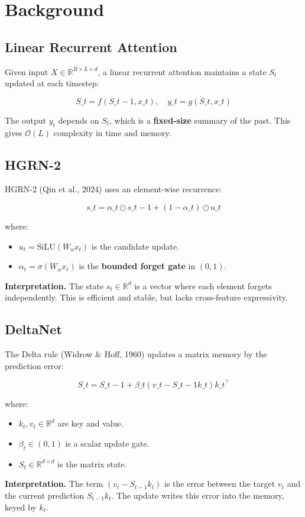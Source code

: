 \section{Background}

\subsection{Linear Recurrent Attention}

Given input $X \in \mathbb{R}^{B \times L \times d}$, a linear recurrent 
attention maintains a state $S_t$ updated at each timestep:

\[
S\_t = f(S\_{t-1}, x\_t), \quad
y\_t = g(S\_t, x\_t)
\tag{3.1}
\]

The output $y_t$ depends on $S_t$, which is a \textbf{fixed-size} summary of the 
past. This gives $\mathcal{O}(L)$ complexity in time and memory.

\subsection{HGRN-2}

HGRN-2 (Qin et al., 2024) uses an element-wise recurrence:

\[
s\_t = \alpha\_t \odot s\_{t-1} + (1 - \alpha\_t) \odot u\_t
\tag{3.2}
\]

where:

\begin{itemize}
\item $u_t = \text{SiLU}(W_u x_t)$ is the candidate update.
\item $\alpha_t = \sigma(W_\alpha x_t)$ is the \textbf{bounded forget gate} in $(0, 1)$.

\end{itemize}
\textbf{Interpretation.} The state $s_t \in \mathbb{R}^d$ is a vector where each 
element forgets independently. This is efficient and stable, but lacks 
cross-feature expressivity.

\subsection{DeltaNet}

The Delta rule (Widrow \& Hoff, 1960) updates a matrix memory by the 
prediction error:

\[
S\_t = S\_{t-1} + \beta\_t (v\_t - S\_{t-1} k\_t) k\_t^\top
\tag{3.3}
\]

where:

\begin{itemize}
\item $k_t, v_t \in \mathbb{R}^d$ are key and value.
\item $\beta_t \in (0, 1)$ is a scalar update gate.
\item $S_t \in \mathbb{R}^{d \times d}$ is the matrix state.

\end{itemize}
\textbf{Interpretation.} The term $(v_t - S_{t-1} k_t)$ is the error between the 
target $v_t$ and the current prediction $S_{t-1} k_t$. The update writes this 
error into the memory, keyed by $k_t$.

